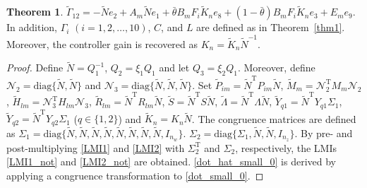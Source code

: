 \documentclass[preprint,review,fleqn,sort&compress,3p]{elsarticle}
\theoremstyle{definition} %
\theoremstyle{definition}%
\newtheorem{thm}{Theorem}[section]
\begin{document}
\begin{thm}
$\widetilde{\Gamma}_{12}
=-\widetilde{N}e_2+A_m\widetilde{N}e_1
+\bar{\theta}B_mF_i\widetilde{K}_ne_8
+(1-\bar{\theta})B_mF_i\widetilde{K}_ne_3+E_me_9$.
In addition, $\Gamma_i$ $(i=1,2,\ldots,10)$, $C$, and $L$ are defined as in Theorem~\ref{thm1}.
Moreover, the controller gain is recovered as
$K_n=\widetilde{K}_n\widetilde{N}^{-1}$.
\begin{proof}
	Define $\widetilde{N}=Q_1^{-1}$, $Q_2=\xi_1 Q_1$ and let $Q_3=\xi_2 Q_1$. Moreover, define
	$\mathcal{N}_2=\mathrm{diag}\{\widetilde{N},\widetilde{N}\}$
	and
	$\mathcal{N}_3=\mathrm{diag}\{\widetilde{N},\widetilde{N},\widetilde{N}\}$. Set $\widetilde{P}_{im}=\widetilde{N}^{\mathrm{T}}P_{im}\widetilde{N}$,
	$\widetilde{M}_m
	=\mathcal{N}_2^{\mathrm{T}}M_m\mathcal{N}_2$,
	$\widetilde{H}_{lm}
	=\mathcal{N}_3^{\mathrm{T}}H_{lm}\mathcal{N}_3$, $\widetilde{R}_{lm}=\widetilde{N}^{\mathrm{T}}R_{lm}\widetilde{N}$, $\widetilde{S}=\widetilde{N}^{\mathrm{T}}S\widetilde{N}$,
	$\widetilde{\Lambda}=\widetilde{N}^{\mathrm{T}}{\Lambda}\widetilde{N}$,
	$\widetilde{Y}_{q1}=\widetilde{N}^{\mathrm{T}}{Y}_{q1}\Sigma_1$,
	$\widetilde{Y}_{q2}=\widetilde{N}^{\mathrm{T}}{Y}_{q2}\Sigma_1$ ($q\in \{1,2\}$)
	and $\widetilde{K}_{n} = K_{n} \widetilde{N}$.
	The congruence matrices are defined as $\Sigma_1 = \mathrm{diag}\{\widetilde{N},\widetilde{N},\widetilde{N},\widetilde{N},\widetilde{N},\widetilde{N},\widetilde{N},\widetilde{N},I_{n_w}\}$. 
	$\Sigma_2 = \mathrm{diag}\{ \Sigma_1,
	\widetilde{N},\widetilde{N},I_{n_z}
	\}$. 
	 By pre- and post-multiplying \eqref{LMI1} and \eqref{LMI2} with $\Sigma_2^{\mathrm{T}}$ and $\Sigma_2$, respectively, the LMIs \eqref{LMI1_not} and \eqref{LMI2_not} are obtained. \eqref{dot_hat_small_0} is derived by applying a congruence transformation to \eqref{dot_small_0}.
\end{proof}
\end{thm}
\end{document}
